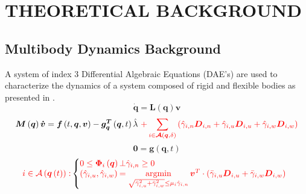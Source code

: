 \documentclass[12pt,onecolumn]{report}
\DeclareMathOperator*{\argminB}{argmin}
\begin{document}

\chapter{THEORETICAL BACKGROUND}\label{c:background}

\section{Multibody Dynamics Background}\label{s:MBD}

A system of index 3 Differential Algebraic Equations (DAE's) are used to characterize the dynamics of a system composed of rigid and flexible bodies as presented in \cite{Chrono2016}.
%
\begin{equation}\label{e:LinTrans}
\boldsymbol{\dot{q}}= \boldsymbol{L}\left(\boldsymbol{q}\right)\boldsymbol{v}
\end{equation}
%
\begin{equation}\label{e:ForceBalance}
\boldsymbol{M}\left(\boldsymbol{q}\right)\boldsymbol{\dot{v}} = \boldsymbol{f}\left(t,\boldsymbol{q},\boldsymbol{v}\right) - \boldsymbol{g^T_q} \left(\boldsymbol{q},t\right)\hat{\lambda}  \textcolor{red}{~+ \sum\limits_{i \in \boldsymbol{\mathcal{A}}\left(\boldsymbol{q},\delta\right) }\left(\hat\gamma_{i,n}\boldsymbol{D}_{i,n} + \hat\gamma_{i,u}\boldsymbol{D}_{i,u} + \hat\gamma_{i,w}\boldsymbol{D}_{i,w}\right)}
\end{equation}
%
\begin{equation}\label{e:Constraints}
\boldsymbol{0} = \boldsymbol{g}\left(\boldsymbol{q},t\right)
\end{equation}
%
{\color{red}\begin{equation}\label{e:Inequalities}
\textcolor{red}{i \in \mathcal{A}\left(\boldsymbol{q}\left(t\right)\right):}
\left\{
     \begin{array}{@{}l@{\thinspace}l}
      \textcolor{red}{0\le\boldsymbol{\Phi}_i \left(\boldsymbol{q}\right)} &\textcolor{red}{\bot \hat\gamma_{i,n}  \ge 0}\\
      \textcolor{red}{\left(\hat\gamma_{i,u},\hat\gamma_{i,w}\right)} &\textcolor{red}{= \argminB\limits_{\sqrt{\bar\gamma_{i,u}^2 + \bar\gamma_{i,w}^2}\le\mu_i \hat\gamma_{i,n}} \boldsymbol{v}^T \cdot \left(\bar\gamma_{i,u}\boldsymbol{D}_{i,u} + \bar\gamma_{i,w}\boldsymbol{D}_{i,w}\right)} \\
% 
     \end{array}
\right . 
\end{equation}}
\end{document}
